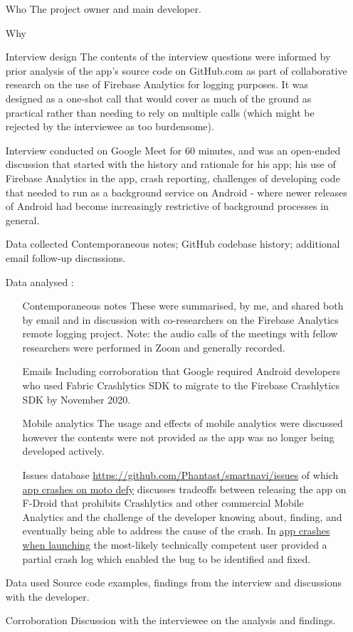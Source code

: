 \begin{itemize}
    \item[Who] The project owner and main developer.
    \item[Why]
    \item[Interview design] The contents of the interview questions were informed by prior analysis of the app's source code on GitHub.com as part of collaborative research on the use of Firebase Analytics for logging purposes. It was designed as a one-shot call that would cover as much of the ground as practical rather than needing to rely on multiple calls (which might be rejected by the interviewee as too burdensome).
    \item[Interview conducted] on Google Meet for 60 minutes, and was an open-ended discussion that started with the history and rationale for his app; his use of Firebase Analytics in the app, crash reporting, challenges of developing code that needed to run as a background service on Android -  where newer releases of Android had become increasingly restrictive of background processes in general.
    \item[Data collected] Contemporaneous notes;  GitHub codebase history; additional email follow-up discussions.
    \item[Data analysed] :
    \begin{itemize}
        \item[Contemporaneous notes] These were summarised, by me, and shared both by email and in discussion with co-researchers on the Firebase Analytics remote logging project. Note: the audio calls of the meetings with fellow researchers were performed in Zoom and generally recorded. 
        \item[Emails] Including corroboration that Google required Android developers who used Fabric Crashlytics SDK to migrate to the Firebase Crashlytics SDK by  November 2020.
        \item[Mobile analytics] The usage and effects of mobile analytics were discussed however the contents were not provided as the app was no longer being developed actively.
        \item[Issues database] \url{https://github.com/Phantast/smartnavi/issues} of which \href{https://github.com/Phantast/smartnavi/issues/10}{app crashes on moto defy} discusses tradeoffs between releasing the app on F-Droid that prohibits Crashlytics and other  commercial Mobile Analytics and the challenge of the developer knowing about, finding, and eventually being able to address the cause of the crash. In \href{https://github.com/Phantast/smartnavi/issues/11}{app crashes when launching} the most-likely technically competent user provided a partial crash log which enabled the bug to be identified and fixed.
    \end{itemize}
    \item[Data used] Source code examples, findings from the interview and discussions with the developer.
    \item[Corroboration] Discussion with the interviewee on  the analysis and findings. 
\end{itemize}

